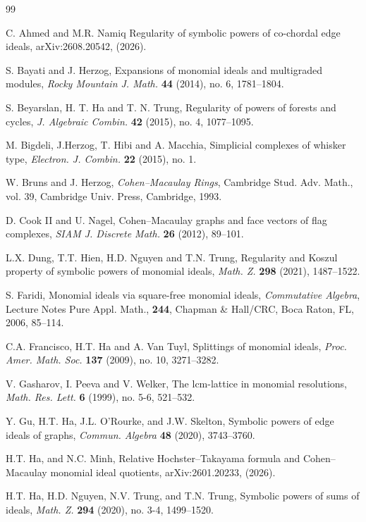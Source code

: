 \documentclass[12pt]{amsart}
\theoremstyle{definition}
\theoremstyle{remark}
\begin{document}
\begin{thebibliography}{99}

 C. Ahmed and M.R. Namiq
Regularity of symbolic powers of co-chordal edge ideals, 
arXiv:2608.20542, (2026).

 S. Bayati and J. Herzog, 
Expansions of monomial ideals and multigraded modules, 
{\it Rocky Mountain J. Math.} {\bf 44} (2014), no. 6, 1781--1804.

S. Beyarslan, H. T. Ha and T. N. Trung, 
Regularity of powers of forests and cycles, 
{\it J. Algebraic Combin.} {\bf 42} (2015), no. 4, 1077--1095.

 M. Bigdeli, J.Herzog, T. Hibi and A. Macchia, 
Simplicial complexes of whisker type, 
{\it Electron. J. Combin.} {\bf 22} (2015), no. 1. 

 W. Bruns and J. Herzog,
{\it Cohen--Macaulay Rings},
Cambridge Stud. Adv. Math., vol. 39, Cambridge Univ. Press, Cambridge, 1993.

 D. Cook II and U. Nagel, 
Cohen--Macaulay graphs and face vectors of flag complexes, 
\textit{SIAM J. Discrete Math.} \textbf{26} (2012), 89--101.

 L.X. Dung, T.T. Hien, H.D. Nguyen and T.N. Trung,
Regularity and Koszul property of symbolic powers of monomial ideals,
{\it Math. Z.} {\bf 298} (2021), 1487--1522. 

 S. Faridi,
Monomial ideals via square-free monomial ideals,
{\it Commutative Algebra}, Lecture Notes Pure Appl. Math.,
{\bf 244}, Chapman \& Hall/CRC, Boca Raton, FL, 2006, 85--114.

 C.A. Francisco, H.T. Ha and A. Van Tuyl, 
Splittings of monomial ideals, 
{\it Proc. Amer. Math. Soc.} {\bf 137} (2009), no. 10, 3271--3282.

V. Gasharov, I. Peeva and V. Welker,
The lcm-lattice in monomial resolutions,
{\it Math. Res. Lett.} {\bf 6} (1999), no. 5-6, 521--532.

 Y. Gu, H.T. Ha, J.L. O’Rourke, and J.W. Skelton,
Symbolic powers of edge ideals of graphs,
{\it Commun. Algebra} {\bf 48} (2020), 3743--3760.

 H.T. Ha, and N.C. Minh, 
Relative Hochster--Takayama formula and Cohen--Macaulay monomial ideal quotients, 
arXiv:2601.20233, (2026). 

 H.T. Ha, H.D. Nguyen, N.V. Trung, and T.N. Trung, 
Symbolic powers of sums of ideals, 
{\it Math. Z.} {\bf 294} (2020), no. 3-4, 1499--1520.


\end{thebibliography}
\end{document}
